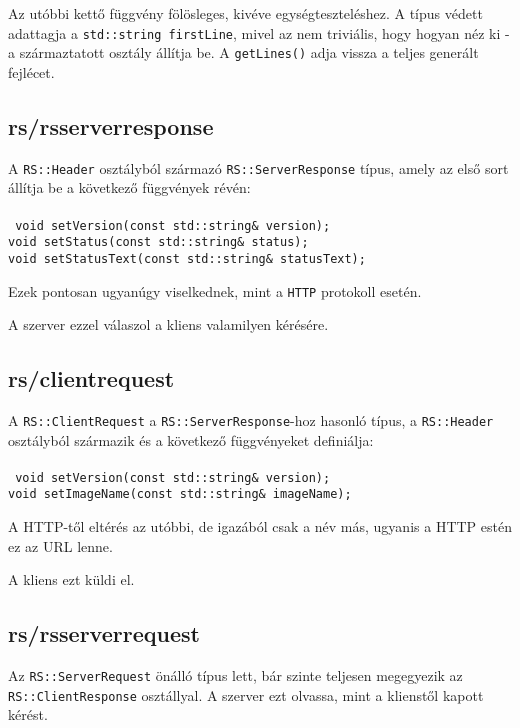 \documentclass[fleqn,10pt,a4paper,titlepage]{article}
\begin{document}
  Az utóbbi kettő függvény fölösleges, kivéve egységteszteléshez. A típus védett adattagja a \texttt{std::string
  firstLine}, mivel az nem triviális, hogy hogyan néz ki - a származtatott osztály állítja be. A \texttt{getLines()}
  adja vissza a teljes generált fejlécet.
  
  \subsection{rs/rsserverresponse}
  A \texttt{RS::Header} osztályból származó \texttt{RS::ServerResponse} típus, amely az első sort állítja be a
  következő függvények révén:\\\\
  \texttt{
    void setVersion(const std::string\& version);\\
    void setStatus(const std::string\& status);\\
    void setStatusText(const std::string\& statusText);\\
  }
  
  Ezek pontosan ugyanúgy viselkednek, mint a \texttt{HTTP} protokoll esetén.
       
  A szerver ezzel válaszol a kliens valamilyen kérésére.
  
  \subsection{rs/clientrequest}
  A \texttt{RS::ClientRequest} a \texttt{RS::ServerResponse}-hoz hasonló típus, a \texttt{RS::Header} osztályból
  származik és a következő függvényeket definiálja:\\\\
  \texttt{
    void setVersion(const std::string\& version);\\
    void setImageName(const std::string\& imageName);\\
  }
  
  A HTTP-től eltérés az utóbbi, de igazából csak a név más, ugyanis a HTTP estén ez az URL lenne.
  
  A kliens ezt küldi el.
  
  \subsection{rs/rsserverrequest}
  Az \texttt{RS::ServerRequest} önálló típus lett, bár szinte teljesen megegyezik az \texttt{RS::ClientResponse}
  osztállyal. A szerver ezt olvassa, mint a klienstől kapott kérést.
\end{document}
